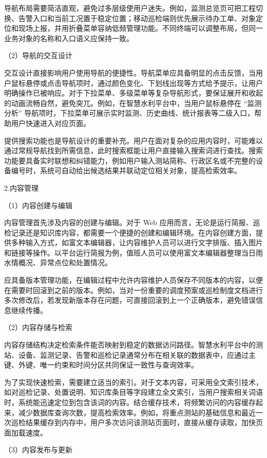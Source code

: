 导航布局需要简洁直观，避免过多层级使用户迷失。例如，监测总览页可把工程切换、告警入口和当前工况置于稳定位置；移动巡检端则优先展示待办工单、对象定位和现场上报，并用折叠菜单容纳低频管理功能。不同终端可以调整布局，但同一业务对象的名称和入口语义应保持一致。

（2）导航的交互设计

交互设计直接影响用户使用导航的便捷性。导航菜单应具备明显的点击反馈，当用户鼠标悬停或点击导航项时，通过颜色变化、下划线出现等方式给予提示，让用户明确操作已被响应。对于下拉菜单、多级菜单等复杂导航形式，要保证展开和收起的动画流畅自然，避免突兀。例如，在智慧水利平台中，当用户鼠标悬停在 “监测分析” 导航项时，下拉菜单可展示实时监测、历史曲线、统计报表等二级入口，帮助用户快速进入对应页面。

提供搜索功能也是导航设计的重要补充。用户在面对复杂的应用内容时，可能难以通过常规导航找到所需信息，此时搜索框能让用户直接输入搜索词进行查找。搜索功能要具备实时联想和纠错能力，例如用户输入测站简称、行政区名或不完整的设备编号时，系统可自动给出候选结果并联动定位相关对象，提高检索效率。

2.内容管理

（1）内容创建与编辑

内容管理首先涉及内容的创建与编辑。对于 Web 应用而言，无论是运行简报、巡检记录还是知识库内容，都需要一个便捷的创建和编辑环境。在内容创建方面，提供多种输入方式，如富文本编辑器，让内容维护人员可以进行文字排版、插入图片和链接等操作。以平台运行简报为例，值班人员可以使用富文本编辑器整理当日雨水情概况、异常点位和处置情况。

应具备版本管理功能，在编辑过程中允许内容维护人员保存不同版本的内容，以便在需要时回滚到之前的版本。例如，当对一份重要的调度预案或巡检制度文档进行多次修改后，若发现新版本存在问题，可直接回滚到上一个正确版本，避免错误信息继续传播。

（2）内容存储与检索

内容存储结构决定检索条件能否映射到稳定的数据访问路径。智慧水利平台中的测站、设备、监测记录、告警和巡检记录通常分布在相关联的数据表中，应通过主键、外键、唯一约束和时间分区共同保证一致性与查询效率。

为了实现快速检索，需要建立适当的索引。对于文本内容，可采用全文索引技术，如对巡检记录、处置说明、知识库条目等字段建立全文索引，当用户搜索相关词语时，系统能迅速定位到包含该词的内容。结合缓存技术，将频繁访问的内容缓存起来，减少数据库查询次数，提高检索效率。例如，将重点测站的基础信息和最近一次巡检结果缓存到内存中，用户多次访问该测站页面时，直接从缓存读取，加快页面加载速度。

（3）内容发布与更新

